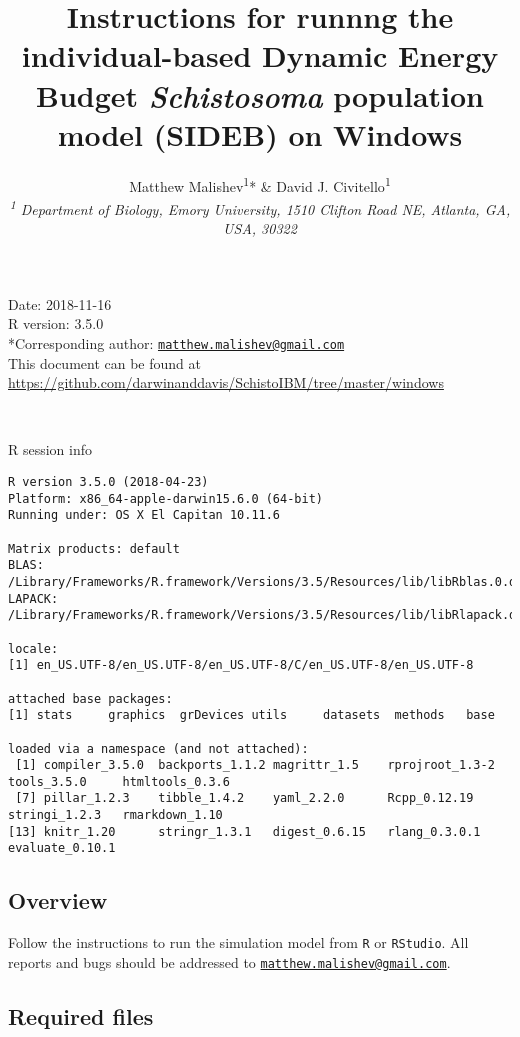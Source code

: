 \documentclass[10,portrait]{article}
\title{Instructions for runnng the individual-based Dynamic Energy Budget
\emph{Schistosoma} population model (SIDEB) on Windows}
\author{Matthew Malishev\textsuperscript{1}* \& David J.
Civitello\textsuperscript{1}\\[2\baselineskip]\emph{\textsuperscript{1}
Department of Biology, Emory University, 1510 Clifton Road NE, Atlanta,
GA, USA, 30322}}
\date{}
\begin{document}
\maketitle

{
\hypersetup{linkcolor=black}
\setcounter{tocdepth}{4}
\tableofcontents
}
\newpage   

Date: 2018-11-16\\
R version: 3.5.0\\
*Corresponding author:
\href{mailto:matthew.malishev@gmail.com}{\nolinkurl{matthew.malishev@gmail.com}}\\
This document can be found at
\url{https://github.com/darwinanddavis/SchistoIBM/tree/master/windows}

~

R session info

\begin{verbatim}
R version 3.5.0 (2018-04-23)
Platform: x86_64-apple-darwin15.6.0 (64-bit)
Running under: OS X El Capitan 10.11.6

Matrix products: default
BLAS: /Library/Frameworks/R.framework/Versions/3.5/Resources/lib/libRblas.0.dylib
LAPACK: /Library/Frameworks/R.framework/Versions/3.5/Resources/lib/libRlapack.dylib

locale:
[1] en_US.UTF-8/en_US.UTF-8/en_US.UTF-8/C/en_US.UTF-8/en_US.UTF-8

attached base packages:
[1] stats     graphics  grDevices utils     datasets  methods   base     

loaded via a namespace (and not attached):
 [1] compiler_3.5.0  backports_1.1.2 magrittr_1.5    rprojroot_1.3-2 tools_3.5.0     htmltools_0.3.6
 [7] pillar_1.2.3    tibble_1.4.2    yaml_2.2.0      Rcpp_0.12.19    stringi_1.2.3   rmarkdown_1.10 
[13] knitr_1.20      stringr_1.3.1   digest_0.6.15   rlang_0.3.0.1   evaluate_0.10.1
\end{verbatim}

\newpage  

\subsection{Overview}\label{overview}

Follow the instructions to run the simulation model from \texttt{R} or
\texttt{RStudio}. All reports and bugs should be addressed to
\href{mailto:matthew.malishev@gmail.com}{\nolinkurl{matthew.malishev@gmail.com}}.

\subsection{Required files}\label{required-files}
\end{document}
